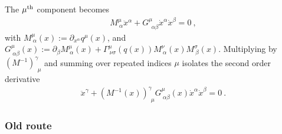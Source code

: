 \documentclass[letterpaper,10pt,english]{jupyterBook}
\begin{document}
\sphinxAtStartPar
The \(\mu^{\rm th}\) component becomes
\begin{equation*}
\begin{split}M^{\mu}_{\ \alpha} \ddot{x}^{\alpha} + G^{\mu}_{\ \ \alpha \beta} \dot{x}^\alpha \dot{x}^\beta = 0 \ ,\end{split}
\end{equation*}
\sphinxAtStartPar
with \(M^{\mu}_{\ \alpha}(x) := \partial_{x^\alpha} q^{\mu}(x)\), and \(G^{\mu}_{\ \alpha \beta}(x) := \partial_\beta M^{\mu}_{\ \alpha}(x) + \Gamma^{\mu}_{\ \nu \sigma}(q(x)) M^{\nu}_{\ \alpha}(x) M^{\sigma}_{\ \beta}(x)\). Multiplying by \(\left( M^{-1} \right)^{\gamma}_{\ \ \mu}\) and summing over repeated indices \(\mu\) isolates the second order derivative
\begin{equation*}
\begin{split}\ddot{x}^\gamma + \left( M^{-1}(x) \right)^\gamma_{\ \ \mu} G^{\mu}_{\ \alpha \beta}(x) \dot{x}^\alpha \dot{x}^\beta = 0 \ .\end{split}
\end{equation*}
\sphinxAtStartPar
{}
\subsubsection*{Old route}
\end{document}
